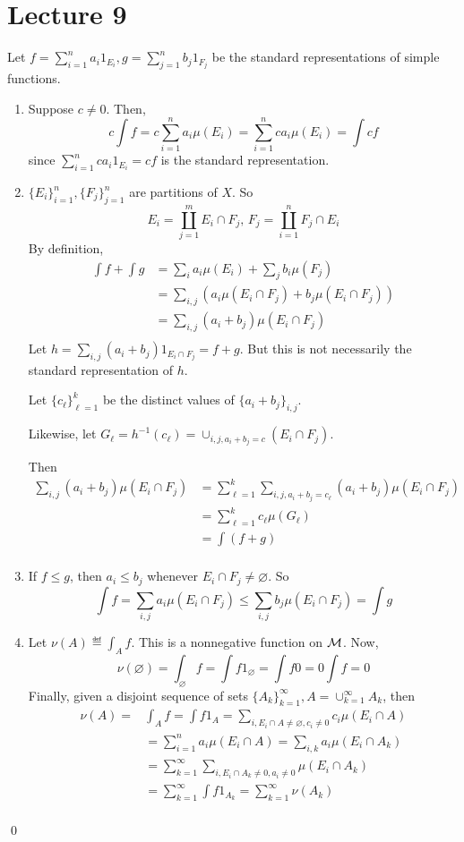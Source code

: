 \documentclass[x11names,reqno,14pt]{extarticle}
\newcommand*{\oo}{\infty}
\newcommand{\seq}[1]{_{#1 = 1}^\oo}
\begin{document}
\section*{Lecture 9}

\proof

Let $f = \sum_{i=1}^na_i1_{E_i}, g = \sum_{j=1}^nb_j1_{F_j}$ be the standard representations of simple functions. 

\begin{enumerate}[label=(\alph*)]
\item Suppose $c \neq0$. Then, 
\[
c\int f = c\sum_{i=1}^na_i\mu(E_i) = \sum_{i=1}^nca_i\mu(E_i) = \int cf
\]
since $\sum_{i=1}^nca_i1_{E_i} = cf$ is the standard representation. 
\item $\{E_i\}_{i=1}^n, \{F_j\}_{j=1}^n$ are partitions of $X$. So 
\[
E_i = \coprod_{j=1}^mE_i\cap F_j,\, F_j = \coprod_{i=1}^nF_j\cap E_i
\]
By definition, 
\begin{align*}
\int f + \int g & =\sum_i a_i\mu(E_i) + \sum_jb_i\mu(F_j) \\
					 & = \sum_{i, j}\left(a_i\mu(E_i\cap F_j) + b_j\mu(E_i \cap F_j) \right) \\
					 & = \sum_{i, j}(a_i + b_j)\mu(E_i \cap F_j)\\
\end{align*}
Let $h = \sum_{i,j}(a_i + b_j)1_{E_i\cap F_j} = f + g$. But this is not necessarily the standard representation of $h$. 

Let $\{c_\ell\}_{\ell=1}^k$ be the distinct values of $\{a_i + b_j\}_{i, j}$. 

Likewise, let $G_\ell = h^{-1}(c_\ell) = \cup_{i, j, a_i + b_j = c}(E_i \cap F_j)$.

Then
\begin{align*}
\sum_{i, j}(a_i + b_j)\mu(E_i \cap F_j) & = \sum_{\ell=1}^k\sum_{i, j, a_i + b_j = c_\ell}(a_i + b_j)\mu(E_i \cap F_j) \\
												     & = \sum_{\ell=1}^kc_\ell\mu(G_\ell) \\
												     & = \int (f + g) \\
\end{align*}
\item If $f \leq g$, then $a_i \leq b_j$ whenever $E_i \cap F_j \neq\varnothing$. So
\[
\int f  = \sum_{i, j}a_i\mu(E_i \cap F_j) \leq \sum_{i, j}b_j\mu(E_i\cap F_j) = \int g
\]
\item Let $\nu(A) \eqdef \int_Af$. This is a nonnegative function on $\mathcal{M}$. Now,
\[
\nu(\varnothing) = \int_{\varnothing}f = \int f1_{\varnothing} = \int f 0 = 0\int f = 0
\]
Finally, given a disjoint sequence of sets $\{A_k\}\seq{k}, A = \cup\seq{k}A_k$, then
\begin{align*}
\nu(A) = & \int_Af = \int f1_A = \sum_{i, E_i \cap A \neq\varnothing,c_i\neq0}c_i\mu(E_i \cap A) \\
			& = \sum_{i=1}^na_i\mu(E_i\cap A) = \sum_{i, k}a_i\mu(E_i \cap A_k) \\
			& = \sum\seq{k}\sum_{i, E_i \cap A_k \neq0, a_i\neq0}\mu(E_i \cap A_k) \\
			& = \sum\seq{k}\int f1_{A_k} = \sum\seq{k}\nu(A_k)\\
\end{align*}
\end{enumerate}
\qed
\end{document}
